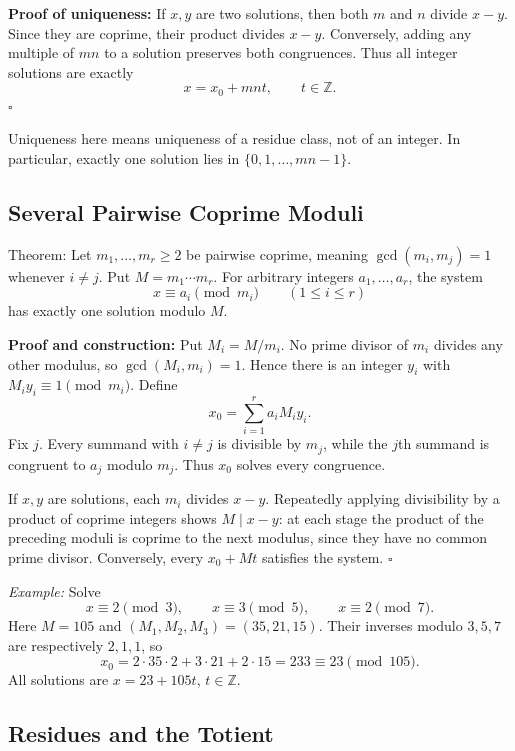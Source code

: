 \documentclass[a4paper,11pt,abstracton]{scrartcl}
\theoremstyle{dotlessP}
\theoremstyle{dotlessS}
\theoremstyle{remark}
\theoremstyle{definition}
\begin{document}
\textbf{Proof of uniqueness:}
If $x,y$ are two solutions, then both $m$ and $n$ divide $x-y$.
Since they are coprime, their product divides $x-y$.
Conversely, adding any multiple of $mn$ to a solution preserves both
congruences. Thus all integer solutions are exactly
\[
    x=x_0+mnt,\qquad t\in\mathbb{Z}.
\]
\hfill$\square$


Uniqueness here means uniqueness of a residue class, not of an integer.
In particular, exactly one solution lies in $\{0,1,\ldots,mn-1\}$.

\subsection{Several Pairwise Coprime Moduli}

\begin{mainbox}{Theorem:}
Let $m_1,\ldots,m_r\geq2$ be pairwise coprime, meaning
$\gcd(m_i,m_j)=1$ whenever $i\neq j$. Put $M=m_1\cdots m_r$.
For arbitrary integers $a_1,\ldots,a_r$, the system
\[
    x\equiv a_i\pmod{m_i}\qquad(1\leq i\leq r)
\]
has exactly one solution modulo $M$.
\end{mainbox}

\textbf{Proof and construction:}
Put $M_i=M/m_i$. No prime divisor of $m_i$ divides any other modulus,
so $\gcd(M_i,m_i)=1$. Hence there is an integer $y_i$ with
$M_i y_i\equiv1\pmod{m_i}$. Define
\[
    \boxed{x_0=\sum_{i=1}^{r}a_iM_i y_i.}
\]
Fix $j$. Every summand with $i\neq j$ is divisible by $m_j$, while
the $j$th summand is congruent to $a_j$ modulo $m_j$.
Thus $x_0$ solves every congruence.

If $x,y$ are solutions, each $m_i$ divides $x-y$.
Repeatedly applying divisibility by a product of coprime integers
shows $M\mid x-y$: at each stage the product of the preceding moduli
is coprime to the next modulus, since they have no common prime divisor.
Conversely, every $x_0+Mt$ satisfies the system.
\hfill$\square$



\begin{example_box}
\textit{Example:}
Solve
\[
    x\equiv2\pmod3,\qquad x\equiv3\pmod5,\qquad x\equiv2\pmod7.
\]
Here $M=105$ and $(M_1,M_2,M_3)=(35,21,15)$.
Their inverses modulo $3,5,7$ are respectively $2,1,1$, so
\[
    x_0=2\cdot35\cdot2+3\cdot21+2\cdot15=233\equiv23\pmod{105}.
\]
All solutions are $x=23+105t$, $t\in\mathbb{Z}$.
\end{example_box}


\subsection{Residues and the Totient}
\end{document}
